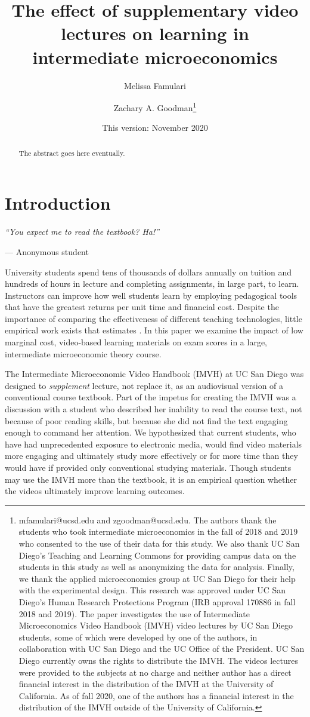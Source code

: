 \documentclass[12pt]{article}
\title{The effect of supplementary video lectures on learning in intermediate microeconomics}
\author{Melissa Famulari}
\author{Zachary A. Goodman\thanks{mfamulari@ucsd.edu and zgoodman@ucsd.edu. The authors thank the students who took intermediate microeconomics in the fall of 2018 and 2019 who consented to the use of their data for this study. We also thank UC San Diego's Teaching and Learning Commons for providing campus data on the students in this study as well as anonymizing the data for analysis. Finally, we thank the applied microeconomics group at UC San Diego for their help with the experimental design. This research was approved under UC San Diego's Human Research Protections Program (IRB approval 170886 in fall 2018 and 2019). The paper investigates the use of Intermediate Microeconomics Video Handbook (IMVH) video lectures by UC San Diego students, some of which were developed by one of the authors, in collaboration with UC San Diego and the UC Office of the President. UC San Diego currently owns the rights to distribute the IMVH. The videos lectures were provided to the subjects at no charge and neither author has a direct financial interest in the distribution of the IMVH at the University of California. As of fall 2020, one of the authors has a financial interest in the distribution of the IMVH outside of the University of California.}}
\affil{University of California, San Diego}
\date{This version: November 2020} %
\begin{document}
\maketitle
\begin{abstract}
	The abstract goes here eventually.
\end{abstract}

\newpage


\section{Introduction}

\epigraph{\textit{``You expect me to read the textbook? Ha!''}}{--- Anonymous student}\bigskip

University students spend tens of thousands of dollars annually on tuition and hundreds of hours in lecture and completing assignments, in large part, to learn. Instructors can improve how well students learn by employing pedagogical tools that have the greatest returns per unit time and financial cost. Despite the importance of comparing the effectiveness of different teaching technologies, little empirical work exists that estimates . In this paper we examine the impact of low marginal cost, video-based learning materials on exam scores in a large, intermediate microeconomic theory course. %

The Intermediate Microeconomic Video Handbook (IMVH) at UC San Diego was designed to \textit{supplement} lecture, not replace it, as an audiovisual version of a conventional course textbook. Part of the impetus for creating the IMVH was a discussion with a student who described her inability to read the course text, not because of poor reading skills, but because she did not find the text engaging enough to command her attention. We hypothesized that current students, who have had unprecedented exposure to electronic media, would find video materials more engaging and ultimately study more effectively or for more time than they would have if provided only conventional studying materials. Though students may use the IMVH more than the textbook, it is an empirical question whether the videos ultimately improve learning outcomes.
\end{document}
